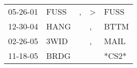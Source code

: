 \begin{supertabular}{p{0.07\textwidth}p{0.06\textwidth}p{0.02\textwidth}p{0.02\textwidth}p{0.06\textwidth}}
 05-26-01\textsuperscript{} &  FUSS\textsuperscript{} &  , &  \textgreater &  FUSS\textsuperscript{} \\
 12-30-04\textsuperscript{} &  HANG\textsuperscript{} &    &             , &  BTTM\textsuperscript{} \\
 02-26-05\textsuperscript{} &  3WID\textsuperscript{} &    &             , &  MAIL\textsuperscript{} \\
 11-18-05\textsuperscript{} &  BRDG\textsuperscript{} &    &               &                   *CS2* \\
\end{supertabular}
